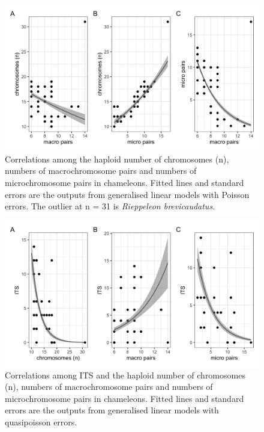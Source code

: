 \documentclass[a4paper, 12pt]{article}
\begin{document}
\begin{figure}[H]
 \centering
  \includegraphics[width = \linewidth]{figures/micro-macro-chromosomes.png}
  \caption{Correlations among the haploid number of chromosomes (n), numbers of macrochromosome pairs and numbers of microchromosome pairs in chameleons. Fitted lines and standard errors are the outputs from generalised linear models with Poisson errors. The outlier at n = 31 is \textit{Rieppeleon brevicaudatus}.
}
  \label{fig-otus-macro}
\end{figure} 


\newpage
\begin{figure}[H]
 \centering
  \includegraphics[width = \linewidth]{figures/ITS-chromosomes.png}
  \caption{Correlations among ITS and the haploid number of chromosomes (n), numbers of macrochromosome pairs and numbers of microchromosome pairs in chameleons. Fitted lines and standard errors are the outputs from generalised linear models with quasipoisson errors.
}
  \label{fig-otus-its}
\end{figure} 
\end{document}
